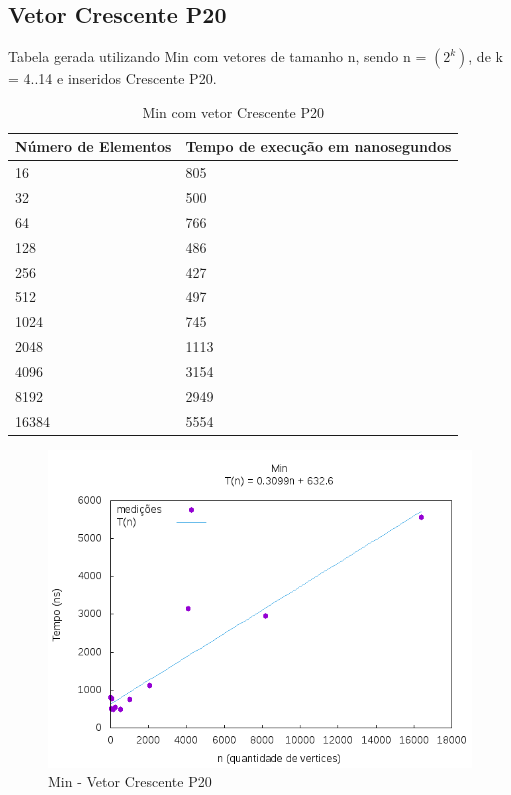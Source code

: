 \documentclass[12pt,a4paper,twoside]{report}
\begin{document}
\subsection{Vetor Crescente P20}
Tabela gerada utilizando Min com vetores de tamanho n, sendo n = $(2^k)$, de k = 4..14 e inseridos Crescente P20.
\begin{table}[H]
\centering
\caption{Min com vetor Crescente P20}
\label{my-label}
\begin{tabular}{|l|l|}
\hline
\multicolumn{1}{|c|}{\textbf{Número de Elementos}} & \multicolumn{1}{c|}{\textbf{Tempo de execução em nanosegundos}} \\ \hline
16 & 805 \\ \hline
32 & 500 \\ \hline
64 & 766 \\ \hline
128 & 486 \\ \hline
256 & 427 \\ \hline
512 & 497 \\ \hline
1024 & 745 \\ \hline
2048 & 1113 \\ \hline
4096 & 3154 \\ \hline
8192 & 2949 \\ \hline
16384 & 5554 \\ \hline
\end{tabular}
\end{table}

\begin{figure}[H]
    \centering
    \includegraphics[width=0.7\linewidth]{graficos/Min/Crescente P20/Min.png}
  \caption{Min - Vetor Crescente P20}
\end{figure}
\end{document}
